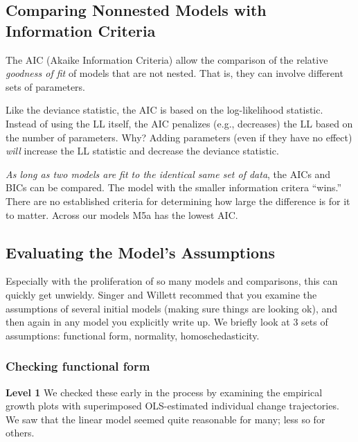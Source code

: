 \documentclass[
  11pt,
]{book}
\begin{document}
\hypertarget{comparing-nonnested-models-with-information-criteria}{%
\subsection{Comparing Nonnested Models with Information Criteria}\label{comparing-nonnested-models-with-information-criteria}}

The AIC (Akaike Information Criteria) allow the comparison of the relative \emph{goodness of fit} of models that are not nested. That is, they can involve different sets of parameters.

Like the deviance statistic, the AIC is based on the log-likelihood statistic. Instead of using the LL itself, the AIC penalizes (e.g., decreases) the LL based on the number of parameters. Why? Adding parameters (even if they have no effect) \emph{will} increase the LL statistic and decrease the deviance statistic.

\emph{As long as two models are fit to the identical same set of data}, the AICs and BICs can be compared. The model with the smaller information critera ``wins.'' There are no established criteria for determining how large the difference is for it to matter. Across our models M5a has the lowest AIC.

\hypertarget{evaluating-the-models-assumptions}{%
\subsection{Evaluating the Model's Assumptions}\label{evaluating-the-models-assumptions}}

Especially with the proliferation of so many models and comparisons, this can quickly get unwieldy. Singer and Willett \citeyearpar{singer_applied_2003} recommed that you examine the assumptions of several initial models (making sure things are looking ok), and then again in any model you explicitly write up. We briefly look at 3 sets of assumptions: functional form, normality, homoschedasticity.

\hypertarget{checking-functional-form}{%
\subsubsection{Checking functional form}\label{checking-functional-form}}

\textbf{Level 1} We checked these early in the process by examining the empirical growth plots with superimposed OLS-estimated individual change trajectories. We saw that the linear model seemed quite reasonable for many; less so for others.
\end{document}
